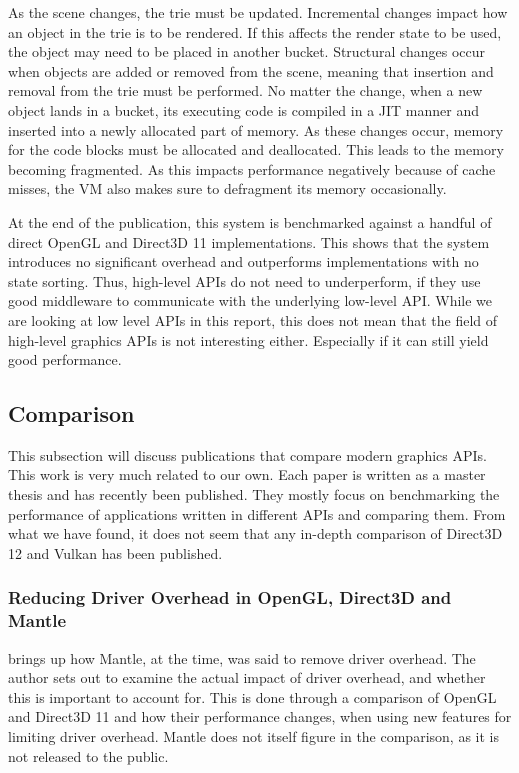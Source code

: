 As the scene changes, the trie must be updated.
Incremental changes impact how an object in the trie is to be rendered.
If this affects the render state to be used, the object may need to be placed in another bucket.
Structural changes occur when objects are added or removed from the scene, meaning that insertion and removal from the trie must be performed.
No matter the change, when a new object lands in a bucket, its executing code is compiled in a \gls{JIT} manner and inserted into a newly allocated part of memory.
As these changes occur, memory for the code blocks must be allocated and deallocated. 
This leads to the memory becoming fragmented.
As this impacts performance negatively because of cache misses, the \gls{VM} also makes sure to defragment its memory occasionally.

 
At the end of the publication, this system is benchmarked against a handful of direct OpenGL and Direct3D 11 implementations. 
This shows that the system introduces no significant overhead and outperforms implementations with no state sorting. 
Thus, high-level \glspl{API} do not need to underperform, if they use good middleware to communicate with the underlying low-level \gls{API}. 
While we are looking at low level \glspl{API} in this report, this does not mean that the field of high-level graphics \glspl{API} is not interesting either. 
Especially if it can still yield good performance.


\subsection{Comparison}
This subsection will discuss publications that compare modern graphics \glspl{API}.
This work is very much related to our own. Each paper is written as a master thesis and has recently been published.
They mostly focus on benchmarking the performance of applications written in different \glspl{API} and comparing them.
From what we have found, it does not seem that any in-depth comparison of Direct3D 12 and Vulkan has been published. 


\subsubsection{Reducing Driver Overhead in OpenGL, Direct3D and Mantle}
\citet{dobersberger_2015_reducing} brings up how Mantle, at the time, was said to remove driver overhead. 
The author sets out to examine the actual impact of driver overhead, and whether this is important to account for.
This is done through a comparison of OpenGL and Direct3D 11 and how their performance changes, when using new features for limiting driver overhead.
Mantle does not itself figure in the comparison, as it is not released to the public.


